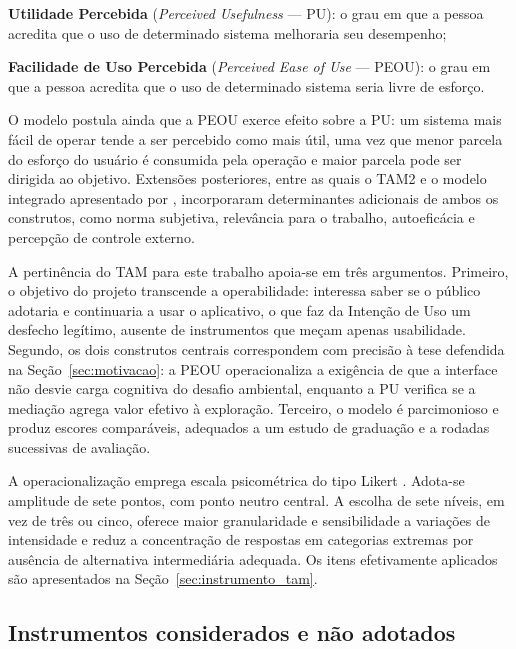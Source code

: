 \begin{alineas}
  \item \textbf{Utilidade Percebida} (\textit{Perceived Usefulness} --- PU): o
  grau em que a pessoa acredita que o uso de determinado sistema melhoraria seu
  desempenho;

  \item \textbf{Facilidade de Uso Percebida} (\textit{Perceived Ease of Use} ---
  PEOU): o grau em que a pessoa acredita que o uso de determinado sistema seria
  livre de esforço.
\end{alineas}

O modelo postula ainda que a PEOU exerce efeito sobre a PU: um sistema mais fácil
de operar tende a ser percebido como mais útil, uma vez que menor parcela do
esforço do usuário é consumida pela operação e maior parcela pode ser dirigida ao
objetivo. Extensões posteriores, entre as quais o TAM2 e o modelo integrado
apresentado por , incorporaram determinantes
adicionais de ambos os construtos, como norma subjetiva, relevância para o
trabalho, autoeficácia e percepção de controle externo.

A pertinência do TAM para este trabalho apoia-se em três argumentos. Primeiro, o
objetivo do projeto transcende a operabilidade: interessa saber se o público
adotaria e continuaria a usar o aplicativo, o que faz da Intenção de Uso um
desfecho legítimo, ausente de instrumentos que meçam apenas usabilidade. Segundo,
os dois construtos centrais correspondem com precisão à tese defendida na
Seção~\ref{sec:motivacao}: a PEOU operacionaliza a exigência de que a interface
não desvie carga cognitiva do desafio ambiental, enquanto a PU verifica se a
mediação agrega valor efetivo à exploração. Terceiro, o modelo é parcimonioso e
produz escores comparáveis, adequados a um estudo de graduação e a rodadas
sucessivas de avaliação.

A operacionalização emprega escala psicométrica do tipo Likert
\cite{likert1932}. Adota-se amplitude de sete pontos, com ponto neutro central.
A escolha de sete níveis, em vez de três ou cinco, oferece maior granularidade e
sensibilidade a variações de intensidade e reduz a concentração de respostas em
categorias extremas por ausência de alternativa intermediária adequada. Os itens
efetivamente aplicados são apresentados na Seção~\ref{sec:instrumento_tam}.

\subsection{Instrumentos considerados e não adotados}
\label{sec:instrumentos_excluidos}

